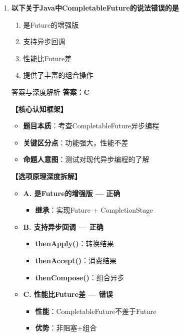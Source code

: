 \documentclass[12pt, a4paper]{ctexart}
\begin{document}
\begin{enumerate}[label=\textbf{\arabic*.}]
	\item \textbf{以下关于Java中CompletableFuture的说法错误的是}
	      \begin{enumerate}[label=\Alph*.]
		      \item 是Future的增强版
		      \item 支持异步回调
		      \item 性能比Future差
		      \item 提供了丰富的组合操作
	      \end{enumerate}

	      \begin{bluebox}{答案与深度解析}
		      \textbf{答案：C}

		      \textbf{【核心认知框架】}
		      \begin{itemize}[label={}, leftmargin=*, nosep]
			      \item \textbf{题目本质}：考查CompletableFuture异步编程
			      \item \textbf{关键区分点}：功能强大，性能不差
			      \item \textbf{命题人意图}：测试对现代异步编程的了解
		      \end{itemize}

		      \textbf{【选项原理深度拆解】}
					  \begin{itemize}[label={}, leftmargin=*, nosep]

		      \item \textbf{A. 是Future的增强版 — 正确}
		      \begin{itemize}[label={}, leftmargin=*, nosep]
			      \item \textbf{继承}：实现Future + CompletionStage
		      \end{itemize}

		      \item \textbf{B. 支持异步回调 — 正确}
		      \begin{itemize}[label={}, leftmargin=*, nosep]
			      \item \textbf{thenApply()}：转换结果
			      \item \textbf{thenAccept()}：消费结果
			      \item \textbf{thenCompose()}：组合异步
		      \end{itemize}

		      \item \textbf{C. 性能比Future差 — 错误}
		      \begin{itemize}[label={}, leftmargin=*, nosep]
			      \item \textbf{性能}：CompletableFuture不差于Future
			      \item \textbf{优势}：非阻塞+组合
		      \end{itemize}


\end{itemize}
\end{bluebox}
\end{enumerate}
\end{document}
